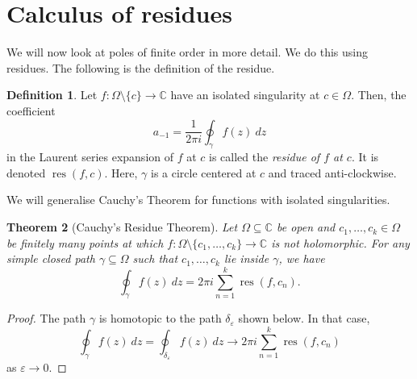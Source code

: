 \documentclass[a4paper, openany]{memoir}
\theoremstyle{definition}
\newtheorem{definition}{Definition}[section]
\theoremstyle{plain}
\newtheorem{theorem}[definition]{Theorem}
\begin{document}
\newpage

\section{Calculus of residues}
We will now look at poles of finite order in more detail. We do this using residues. The following is the definition of the residue.
\begin{definition}
    Let $f: \Omega \setminus \{c\} \to \mathbb{C}$ have an isolated singularity at $c \in \Omega$. Then, the coefficient
    \[a_{-1} = \frac{1}{2\pi i} \oint_\gamma f(z) \ dz\]
    in the Laurent series expansion of $f$ at $c$ is called the \emph{residue of $f$ at $c$}. It is denoted $\operatorname{res}(f, c)$. Here, $\gamma$ is a circle centered at $c$ and traced anti-clockwise.
\end{definition}

We will generalise Cauchy's Theorem for functions with isolated singularities.
\begin{theorem}[Cauchy's Residue Theorem]
    Let $\Omega \subseteq \mathbb{C}$ be open and $c_1, \dots, c_k \in \Omega$ be finitely many points at which $f: \Omega \setminus \{c_1, \dots, c_k \} \to \mathbb{C}$ is not holomorphic. For any simple closed path $\gamma \subseteq \Omega$ such that $c_1, \dots, c_k$ lie inside $\gamma$, we have
    \[\oint_\gamma f(z) \ dz = 2\pi i \sum_{n=1}^k \operatorname{res}(f, c_n).\]
\end{theorem}
\begin{proof}
    The path $\gamma$ is homotopic to the path $\delta_\varepsilon$ shown below.
    In that case,
    \[\oint_\gamma f(z) \ dz = \oint_{\delta_\varepsilon} f(z) \ dz \to 2\pi i \sum_{n=1}^k \operatorname{res}(f, c_n)\]
    as $\varepsilon \to 0$.
\end{proof}
\end{document}
